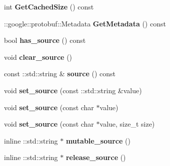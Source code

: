 \begin{DoxyCompactItemize}
int {\bfseries Get\+Cached\+Size} () const
\item 
\mbox{\label{classcaffe_1_1_data_parameter_aed161d5b32b4e9ed26e7251645d9316a}} 
\+::google\+::protobuf\+::\+Metadata {\bfseries Get\+Metadata} () const
\item 
\mbox{\label{classcaffe_1_1_data_parameter_ab4719729d242a53200938f6c3b8145a6}} 
bool {\bfseries has\+\_\+source} () const
\item 
\mbox{\label{classcaffe_1_1_data_parameter_ae619247e83cc5ddd0dabe316f500689d}} 
void {\bfseries clear\+\_\+source} ()
\item 
\mbox{\label{classcaffe_1_1_data_parameter_a625ab4def42c51f5519931b16c7a3cb3}} 
const \+::std\+::string \& {\bfseries source} () const
\item 
\mbox{\label{classcaffe_1_1_data_parameter_a3284b618efaa87ad3fbbd74f6941dca7}} 
void {\bfseries set\+\_\+source} (const \+::std\+::string \&value)
\item 
\mbox{\label{classcaffe_1_1_data_parameter_a4db7080dac9f2b616703434eccc58d6f}} 
void {\bfseries set\+\_\+source} (const char $\ast$value)
\item 
\mbox{\label{classcaffe_1_1_data_parameter_ac199cfdb8beb67c087530aea79965286}} 
void {\bfseries set\+\_\+source} (const char $\ast$value, size\+\_\+t size)
\item 
\mbox{\label{classcaffe_1_1_data_parameter_aa9dbfd67c333ce47da41db4c300d9ee2}} 
inline \+::std\+::string $\ast$ {\bfseries mutable\+\_\+source} ()
\item 
\mbox{\label{classcaffe_1_1_data_parameter_ac1739a15061b26d5eaf7e57118ff2bbe}} 
inline \+::std\+::string $\ast$ {\bfseries release\+\_\+source} ()
\item 
\mbox{\label{classcaffe_1_1_data_parameter_ad9990fab3ff78bf687919b60f04d669e}} 

\end{DoxyCompactItemize}
